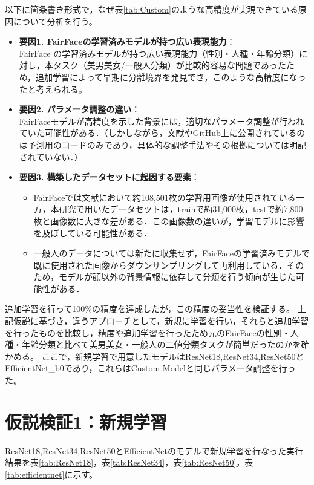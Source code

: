 \documentclass[a4paper,11pt,titlepage]{jsarticle}
\begin{document}
以下に箇条書き形式で，なぜ表\ref{tab:Custom}のような高精度が実現できている原因について分析を行う。

\begin{itemize}
  \item \textbf{要因1. FairFaceの学習済みモデルが持つ広い表現能力}：  \\
  FairFace の学習済みモデルが持つ広い表現能力（性別・人種・年齢分類）に対し，本タスク（美男美女/一般人分類）が比較的容易な問題であったため，追加学習によって早期に分離境界を発見でき，このような高精度になったと考えられる。

  \item \textbf{要因2. パラメータ調整の違い}：  \\
  FairFaceモデルが高精度を示した背景には，適切なパラメータ調整が行われていた可能性がある．（しかしながら，文献\cite{karkkainenFairFace}やGitHub上に公開されているのは予測用のコードのみであり，具体的な調整手法やその根拠については明記されていない．）

  \item \textbf{要因3. 構築したデータセットに起因する要素}：
  \begin{itemize}
    \item FairFaceでは文献\cite{karkkainenFairFace}において約108,501枚の学習用画像が使用されている一方，本研究で用いたデータセットは，trainで約31,000枚，testで約7,800枚と画像数に大きな差がある．この画像数の違いが，学習モデルに影響を及ぼしている可能性がある．
    \item 一般人のデータについては新たに収集せず，FairFaceの学習済みモデルで既に使用された画像からダウンサンプリングして再利用している．そのため，モデルが顔以外の背景情報に依存して分類を行う傾向が生じた可能性がある．
  \end{itemize}
\end{itemize}

追加学習を行って100\%の精度を達成したが，この精度の妥当性を検証する。
上記仮説に基づき，違うアプローチとして，新規に学習を行い，それらと追加学習を行ったものを比較し，精度や追加学習を行ったため元のFairFaceの性別・人種・年齢分類と比べて美男美女・一般人の二値分類タスクが簡単だったのかを確かめる。
ここで，新規学習で用意したモデルはResNet18,ResNet34,ResNet50とEfficientNet\_b0であり，これらはCustom Modelと同じパラメータ調整を行った。


\section{仮説検証1：新規学習}
ResNet18,ResNet34,ResNet50とEfficientNetのモデルで新規学習を行なった実行結果を表\ref{tab:ResNet18}，表\ref{tab:ResNet34}，表\ref{tab:ResNet50}，表\ref{tab:efficientnet}に示す。
\end{document}
